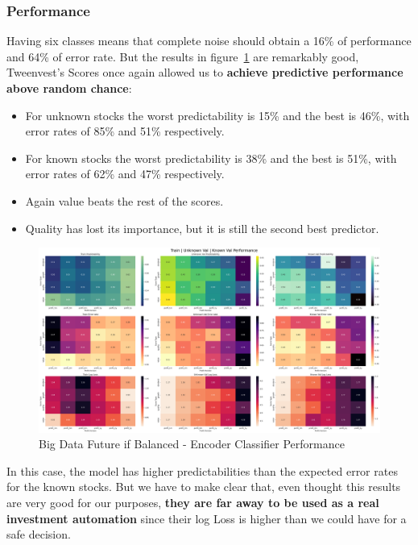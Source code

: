 \documentclass[11pt,english,a4paper,hidelinks]{book}
\begin{document}
\subsubsection{Performance}

\noindent Having six classes means that complete noise should obtain a 16\% of performance and 64\% of error rate. But the results in figure~\ref{fig:multi_class_classifier} are remarkably good, Tweenvest’s Scores once again allowed us to \textbf{achieve predictive performance above random chance}:
\begin{itemize}
    \item For unknown stocks the worst predictability is 15\% and the best is 46\%, with error rates of 85\% and 51\% respectively. 
    \item For known stocks the worst predictability is 38\% and the best is 51\%, with error rates of 62\% and 47\% respectively.
    \item Again value beats the rest of the scores.
    \item Quality has lost its importance, but it is still the second best predictor.
\end{itemize}


\begin{figure}[H]
    \centering
    \includegraphics[width=1\textwidth]{images/code/models/neural_network/classifier_nn/Big Data future - IF HARD Balanced/performance summary.png}
    \caption{Big Data Future \acrshort{if} Balanced - Encoder Classifier Performance}    
    \label{fig:multi_class_classifier}
\end{figure}

\noindent In this case, the model has higher predictabilities than the expected error rates for the known stocks. But we have to make clear that, even thought this results are very good for our purposes, \textbf{they are far away to be used as a real investment automation} since their log Loss is higher than we could have for a safe decision.
\end{document}
